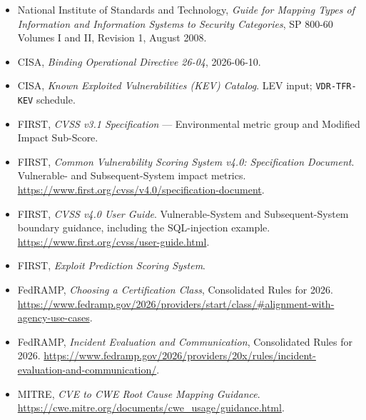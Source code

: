\documentclass[11pt]{article}
\begin{document}
\begin{itemize}[leftmargin=3.4em]
\item[{[SP800-60]}] National Institute of Standards and Technology,
  \emph{Guide for Mapping Types of Information and Information Systems to Security
  Categories}, SP 800-60 Volumes I and II, Revision 1, August 2008.
\item[{[BOD]}] CISA, \emph{Binding Operational Directive 26-04}, 2026-06-10.
\item[{[KEV]}] CISA, \emph{Known Exploited Vulnerabilities (KEV) Catalog}. LEV
  input; \texttt{VDR-TFR-KEV} schedule.
\item[{[CVSS]}] FIRST, \emph{CVSS v3.1 Specification} --- Environmental metric group
  and Modified Impact Sub-Score.
\item[{[CVSS40]}] FIRST, \emph{Common Vulnerability Scoring System v4.0:
  Specification Document}. Vulnerable- and Subsequent-System impact metrics.
  \url{https://www.first.org/cvss/v4.0/specification-document}.
\item[{[CVSS40-UG]}] FIRST, \emph{CVSS v4.0 User Guide}. Vulnerable-System and
  Subsequent-System boundary guidance, including the SQL-injection example.
  \url{https://www.first.org/cvss/user-guide.html}.
\item[{[EPSS]}] FIRST, \emph{Exploit Prediction Scoring System}.
\item[{[CLASS]}] FedRAMP, \emph{Choosing a Certification Class}, Consolidated
  Rules for 2026.
  \url{https://www.fedramp.gov/2026/providers/start/class/#alignment-with-agency-use-cases}.
\item[{[IEC]}] FedRAMP, \emph{Incident Evaluation and Communication},
  Consolidated Rules for 2026.
  \url{https://www.fedramp.gov/2026/providers/20x/rules/incident-evaluation-and-communication/}.
\item[{[CWE-RCM]}] MITRE, \emph{CVE to CWE Root Cause Mapping Guidance}.
  \url{https://cwe.mitre.org/documents/cwe_usage/guidance.html}.
\end{itemize}
\end{document}
